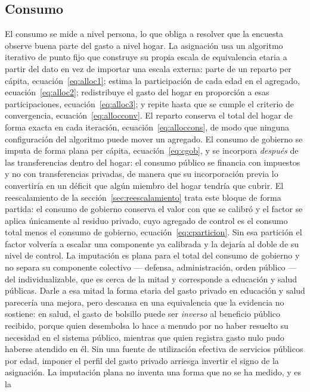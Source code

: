 \documentclass[11pt,a4paper]{article}
\begin{document}
\subsection{Consumo}
El consumo se mide a nivel persona, lo que obliga a resolver que la encuesta observe buena parte
del gasto a nivel hogar. La asignación usa un algoritmo iterativo de punto fijo que construye su
propia escala de equivalencia etaria a partir del dato en vez de importar una escala externa:
parte de un reparto per cápita, ecuación~\eqref{eq:alloc1}; estima la participación de cada edad
en el agregado, ecuación~\eqref{eq:alloc2}; redistribuye el gasto del hogar en proporción a esas
participaciones, ecuación~\eqref{eq:alloc3}; y repite hasta que se cumple el criterio de
convergencia, ecuación~\eqref{eq:allocconv}. El reparto conserva el total del hogar de forma
exacta en cada iteración, ecuación~\eqref{eq:alloccons}, de modo que ninguna configuración del
algoritmo puede mover un agregado. El consumo de gobierno se imputa de forma plana per cápita,
ecuación~\eqref{eq:cgob}, y se incorpora \emph{después} de las transferencias dentro del hogar:
el consumo público se financia con impuestos y no con transferencias privadas, de manera que su
incorporación previa lo convertiría en un déficit que algún miembro del hogar tendría que cubrir.
El reescalamiento de la sección~\ref{sec:reescalamiento} trata este bloque de forma partida: el
consumo de gobierno conserva el valor con que se calibró y el factor se aplica únicamente al
residuo privado, cuyo agregado de control es el consumo total menos el consumo de gobierno,
ecuación~\eqref{eq:cparticion}. Sin esa partición el factor volvería a escalar una componente ya
calibrada y la dejaría al doble de su nivel de control.
La imputación es plana para el total del consumo de gobierno y no separa su componente colectivo
--- defensa, administración, orden público --- del individualizable, que es cerca de la mitad y
corresponde a educación y salud públicas. Darle a esa mitad la forma etaria del gasto privado en
educación y salud parecería una mejora, pero descansa en una equivalencia que la evidencia no
sostiene: en salud, el gasto de bolsillo puede ser \emph{inverso} al beneficio público recibido,
porque quien desembolsa lo hace a menudo por no haber resuelto su necesidad en el sistema público,
mientras que quien registra gasto nulo pudo haberse atendido en él. Sin una fuente de utilización
efectiva de servicios públicos por edad, imponer el perfil del gasto privado arriesga invertir el
signo de la asignación. La imputación plana no inventa una forma que no se ha medido, y es la
\end{document}
